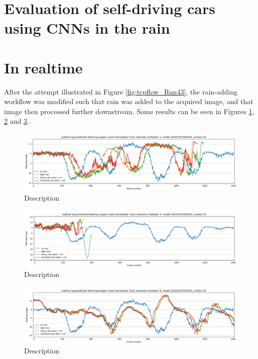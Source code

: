 \section{Evaluation of self-driving cars using CNNs in the rain}

\section{In realtime}

After the attempt illustrated in Figure \ref{fig:tcpflow_Run43}, the rain-adding workflow was modified such that rain was added to the acquired image, and that image then processed further downstream. Some results can be seen in Figures
\ref{fig:sa_GeneratedTrackintensitymultiplier1_20201207091932_nvidia1}, \ref{fig:sa_GeneratedTrackintensitymultiplier4_20201207091932_nvidia1} and
\ref{fig:sa_GeneratedTrackintensitymultiplier8_20201207091932_nvidia1}.


\begin{figure}[ht]
 \centering 
 \includegraphics[width=\textwidth]{Figures/sa_GeneratedTrackintensitymultiplier1_20201207091932_nvidia1.h5.png}
 \caption{Description}
 \label{fig:sa_GeneratedTrackintensitymultiplier1_20201207091932_nvidia1} 
\end{figure}

\begin{figure}[ht]
 \centering 
 \includegraphics[width=\textwidth]{Figures/sa_GeneratedTrackintensitymultiplier4_20201207091932_nvidia1.h5.png}
 \caption{Description}
 \label{fig:sa_GeneratedTrackintensitymultiplier4_20201207091932_nvidia1} 
\end{figure}

\begin{figure}[ht]
 \centering 
 \includegraphics[width=\textwidth]{Figures/sa_GeneratedTrackintensitymultiplier8_20201207091932_nvidia1.h5.png}
 \caption{Description}
 \label{fig:sa_GeneratedTrackintensitymultiplier8_20201207091932_nvidia1} 
\end{figure}

